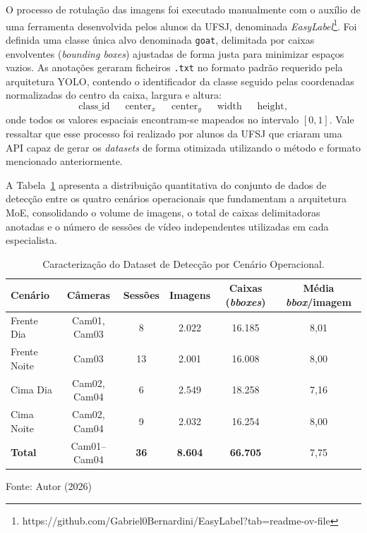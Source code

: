 \documentclass[12pt,fleqn]{article}
\begin{document}
O processo de rotulação das imagens foi executado manualmente com o auxílio de uma ferramenta desenvolvida pelos alunos da UFSJ, denominada \textit{EasyLabel}\footnote{https://github.com/Gabriel0Bernardini/EasyLabel?tab=readme-ov-file}. Foi definida uma classe única alvo denominada \texttt{goat}, delimitada por caixas envolventes (\textit{bounding boxes}) ajustadas de forma justa para minimizar espaços vazios. As anotações geraram ficheiros \texttt{.txt} no formato padrão requerido pela arquitetura YOLO, contendo o identificador da classe seguido pelas coordenadas normalizadas do centro da caixa, largura e altura:
\begin{equation}
    \text{class\_id} \quad \; \; \text{center}_x \quad \; \; \text{center}_y \quad \; \; \text{width} \quad \; \; \text{height},
\end{equation}
%
onde todos os valores espaciais encontram-se mapeados no intervalo $[0, 1]$. Vale ressaltar que esse processo foi realizado por alunos da UFSJ que criaram uma API capaz de gerar os \textit{datasets} de forma otimizada utilizando o método e formato mencionado anteriormente.

A Tabela~\ref{tab:dataset_caracterizacao} apresenta a distribuição quantitativa do conjunto de dados de detecção entre os quatro cenários operacionais que fundamentam a arquitetura MoE, consolidando o volume de imagens, o total de caixas delimitadoras anotadas e o número de sessões de vídeo independentes utilizadas em cada especialista.

\begin{table}[H]
\caption{Caracterização do Dataset de Detecção por Cenário Operacional.}
\label{tab:dataset_caracterizacao}
\centering{}
\begin{tabular*}{\textwidth}{@{\extracolsep{\fill}}lccccc}
\hline
Cenário & Câmeras & Sessões & Imagens & Caixas (\textit{bboxes}) & Média \textit{bbox}/imagem \\
\hline
Frente Dia & Cam01, Cam03 & 8 & 2.022 & 16.185 & 8,01 \\
Frente Noite & Cam03 & 13 & 2.001 & 16.008 & 8,00 \\
Cima Dia & Cam02, Cam04 & 6 & 2.549 & 18.258 & 7,16 \\
Cima Noite & Cam02, Cam04 & 9 & 2.032 & 16.254 & 8,00 \\
\hline
\textbf{Total} & Cam01--Cam04 & \textbf{36} & \textbf{8.604} & \textbf{66.705} & 7,75 \\
\hline
\end{tabular*}
{\footnotesize\centering Fonte: Autor (2026)\par}
\end{table}
\end{document}
